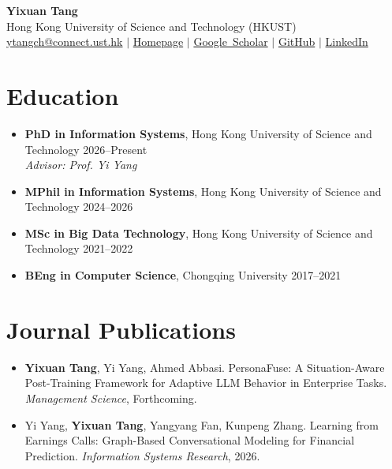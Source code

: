 \documentclass[11pt,a4paper]{article}
\begin{document}
\begin{center}
  {\LARGE \textbf{Yixuan Tang}}\\[2pt]
  Hong Kong University of Science and Technology (HKUST)\\[4pt]
  \href{mailto:ytangch@connect.ust.hk}{ytangch@connect.ust.hk} $\vert$
  \href{https://yixuantt.github.io}{Homepage} $\vert$
  \href{https://scholar.google.com/citations?hl=en&user=4Q9Gje0AAAAJ}{Google~Scholar} $\vert$
  \href{https://github.com/yixuantt}{GitHub} $\vert$
  \href{https://www.linkedin.com/in/yixuan-tang-2023yixuan/}{LinkedIn}
\end{center}

\section*{Education}
\begin{itemize}[itemsep=3pt]
  \item \textbf{PhD in Information Systems}, Hong Kong University of Science and Technology \hfill 2026--Present\\
  \textit{Advisor: Prof. Yi Yang}
  \item \textbf{MPhil in Information Systems}, Hong Kong University of Science and Technology \hfill 2024--2026
  \item \textbf{MSc in Big Data Technology}, Hong Kong University of Science and Technology \hfill 2021--2022
  \item \textbf{BEng in Computer Science}, Chongqing University \hfill 2017--2021
\end{itemize}

\section*{Journal Publications}
\begin{itemize}[itemsep=3pt]
  \item \textbf{Yixuan Tang}, Yi Yang, Ahmed Abbasi. PersonaFuse: A Situation-Aware Post-Training Framework for Adaptive LLM Behavior in Enterprise Tasks. \textit{Management Science}, Forthcoming.
  \item Yi Yang, \textbf{Yixuan Tang}, Yangyang Fan, Kunpeng Zhang. Learning from Earnings Calls: Graph-Based Conversational Modeling for Financial Prediction. \textit{Information Systems Research}, 2026.
\end{itemize}
\end{document}

